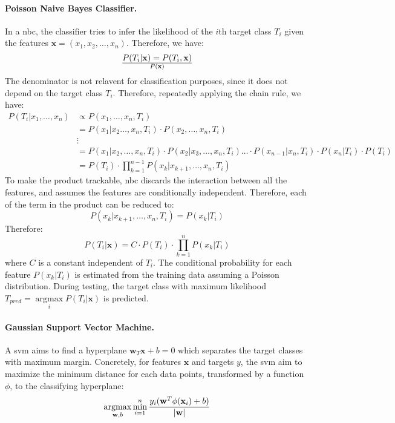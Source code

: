 \paragraph{Poisson Naive Bayes Classifier.}
In a \gls{nbc}, the classifier tries to infer the likelihood of the $i$th target class $T_i$ given the features $\mathbf{x} = (x_1, x_2, \dots, x_n)$. Therefore, we have:
\begin{equation*}
    P(T_i|\mathbf{x}) = P(T_i, \mathbf{x}) \over P(\mathbf{x}) 
\end{equation*}
The denominator is not relavent for classification purposes, since it does not depend on the target class $T_i$. Therefore, repeatedly applying the chain rule, we have:
\begin{align*}
    P(T_i|x_1, \dots, x_n) &\propto P(x_1, \dots, x_n, T_i) \\
                           &= P(x_1|x_2 \dots, x_n, T_i) \cdot P(x_2, \dots, x_n, T_i) \\
                           &\vdots \\
                           &= P(x_1|x_2, \dots, x_n, T_i) \cdot P(x_2|x_3, \dots, x_n, T_i) \dots \cdot P(x_{n-1}|x_n, T_i) \cdot P(x_n|T_i) \cdot P(T_i) \\
                           &= P(T_i) \cdot \prod_{k=1}^{n-1} P(x_k|x_{k+1}, \dots, x_n, T_i)
\end{align*}
To make the product trackable, \gls{nbc} discards the interaction between all the features, and assumes the features are conditionally independent. Therefore, each of the term in the product can be reduced to:
\begin{equation*}
    P(x_k|x_{k+1}, \dots, x_n, T_i) = P(x_k|T_i)
\end{equation*}
Therefore:
\begin{equation*}
    P(T_i|\mathbf{x}) = C\cdot P(T_i) \cdot \prod_{k=1}^n P(x_k|T_i)
\end{equation*}
where $C$ is a constant independent of $T_i$. The conditional probability for each feature $P(x_k|T_i)$ is estimated from the training data assuming a Poisson distribution. During testing, the target class with maximum likelihood $T_{pred}=\underset{i}{\operatorname{argmax}} P(T_i|\mathbf{x})$ is predicted.

\paragraph{Gaussian Support Vector Machine.}
A \gls{svm} aims to find a hyperplane $\mathbf{w}_T\mathbf{x}+b=0$ which separates the target classes with maximum margin. Concretely, for features $\mathbf{x}$ and targets $y$, the \gls{svm} aim to maximize the minimum distance for each data points, transformed by a function $\phi$, to the classifying hyperplane:
\begin{equation} \label{dist}
    \underset{\mathbf{w},b}{\operatorname{argmax}}\min_{i=1}^{n}\frac{y_i(\mathbf{w}^T\phi(\mathbf{x}_i)+b)}{|\mathbf{w}|}
\end{equation}
 
